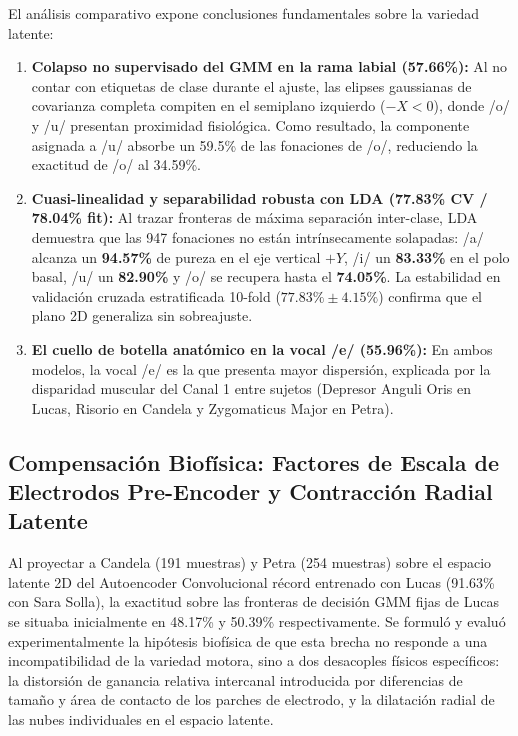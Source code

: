 \documentclass[11pt,a4paper,openany]{book}
\theoremstyle{definition}
\begin{document}
El análisis comparativo expone conclusiones fundamentales sobre la variedad latente:
\begin{enumerate}
    \item \textbf{Colapso no supervisado del GMM en la rama labial (57.66\%):} Al no contar con etiquetas de clase durante el ajuste, las elipses gaussianas de covarianza completa compiten en el semiplano izquierdo ($-X < 0$), donde /o/ y /u/ presentan proximidad fisiológica. Como resultado, la componente asignada a /u/ absorbe un 59.5\% de las fonaciones de /o/, reduciendo la exactitud de /o/ al 34.59\%.
    \item \textbf{Cuasi-linealidad y separabilidad robusta con LDA (77.83\% CV / 78.04\% fit):} Al trazar fronteras de máxima separación inter-clase, LDA demuestra que las 947 fonaciones no están intrínsecamente solapadas: /a/ alcanza un \textbf{94.57\%} de pureza en el eje vertical $+Y$, /i/ un \textbf{83.33\%} en el polo basal, /u/ un \textbf{82.90\%} y /o/ se recupera hasta el \textbf{74.05\%}. La estabilidad en validación cruzada estratificada 10-fold ($77.83\% \pm 4.15\%$) confirma que el plano 2D generaliza sin sobreajuste.
    \item \textbf{El cuello de botella anatómico en la vocal /e/ (55.96\%):} En ambos modelos, la vocal /e/ es la que presenta mayor dispersión, explicada por la disparidad muscular del Canal 1 entre sujetos (Depresor Anguli Oris en Lucas, Risorio en Candela y Zygomaticus Major en Petra).
\end{enumerate}

\subsection{Compensación Biofísica: Factores de Escala de Electrodos Pre-Encoder y Contracción Radial Latente}
\label{subsec:compensacion_biofisica_electrodos_escala}

Al proyectar a Candela (191 muestras) y Petra (254 muestras) sobre el espacio latente 2D del Autoencoder Convolucional récord entrenado con Lucas (91.63\% con Sara Solla), la exactitud sobre las fronteras de decisión GMM fijas de Lucas se situaba inicialmente en 48.17\% y 50.39\% respectivamente. Se formuló y evaluó experimentalmente la hipótesis biofísica de que esta brecha no responde a una incompatibilidad de la variedad motora, sino a dos desacoples físicos específicos: la distorsión de ganancia relativa intercanal introducida por diferencias de tamaño y área de contacto de los parches de electrodo, y la dilatación radial de las nubes individuales en el espacio latente.
\end{document}
